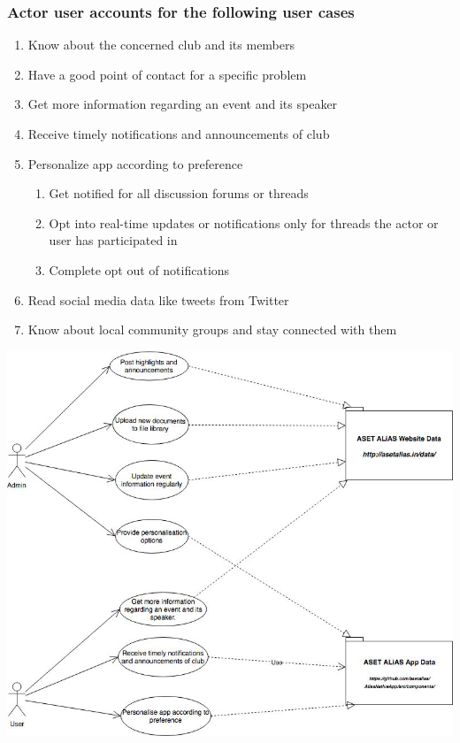 \subsubsection{Actor user accounts for the following user cases}
\begin{enumerate}
    \item Know about the concerned club and its members
    \item Have a good point of contact for a specific problem
    \item Get more information regarding an event and its speaker
    \item Receive timely notifications and announcements of club
    \item Personalize app according to preference
    \begin{enumerate}
        \item Get notified for all discussion forums or threads
        \item Opt into real-time updates or notifications only for threads the actor or user has participated in
        \item Complete opt out of notifications
    \end{enumerate}
    \item Read social media data like tweets from Twitter
    \item Know about local community groups and stay connected with them
\end{enumerate} \bigskip

\includegraphics[width=150mm]{./alias-app-uml.png}\\